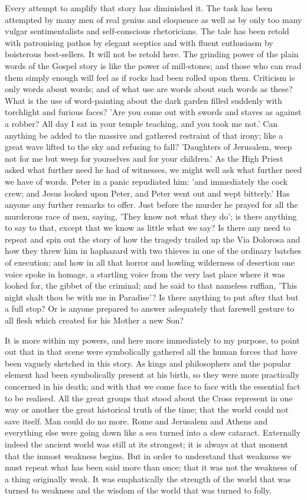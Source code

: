 Every attempt to amplify that story has diminished it. The task has been attempted by many men of real genius and eloquence as well as by only too many vulgar sentimentalists and self-conscious rhetoricians. The tale has been retold with patronising pathos by elegant sceptics and with fluent enthusiasm by boisterous best-sellers. It will not be retold here. The grinding power of the plain words of the Gospel story is like the power of mill-stones; and those who can read them simply enough will feel as if rocks had been rolled upon them. Criticism is only words about words; and of what use are words about such words as these? What is the use of word-painting about the dark garden filled suddenly with torchlight and furious faces? 'Are you come out with swords and staves as against a robber? All day I sat in your temple teaching, and you took me not.' Can anything be added to the massive and gathered restraint of that irony; like a great wave lifted to the sky and refusing to fall? 'Daughters of Jerusalem, weep not for me but weep for yourselves and for your children.' As the High Priest asked what further need he had of witnesses, we might well ask what further need we have of words. Peter in a panic repudiated him: 'and immediately the cock crew; and Jesus looked upon Peter, and Peter went out and wept bitterly.' Has anyone any further remarks to offer. Just before the murder he prayed for all the murderous race of men, saying, 'They know not what they do'; is there anything to say to that, except that we know as little what we say? Is there any need to repeat and spin out the story of how the tragedy trailed up the Via Dolorosa and how they threw him in haphazard with two thieves in one of the ordinary batches of execution; and how in all that horror and howling wilderness of desertion one voice spoke in homage, a startling voice from the very last place where it was looked for, the gibbet of the criminal; and he said to that nameless ruffian, 'This night shalt thou be with me in Paradise'? Is there anything to put after that but a full stop? Or is anyone prepared to answer adequately that farewell gesture to all flesh which created for his Mother a new Son?

It is more within my powers, and here more immediately to my purpose, to point out that in that scene were symbolically gathered all the human forces that have been vaguely sketched in this story. As kings and philosophers and the popular element had been symbolically present at his birth, so they were more practically concerned in his death; and with that we come face to face with the essential fact to be realised. All the great groups that stood about the Cross represent in one way or another the great historical truth of the time; that the world could not save itself. Man could do no more. Rome and Jerusalem and Athens and everything else were going down like a sea turned into a slow cataract. Externally indeed the ancient world was still at its strongest; it is always at that moment that the inmost weakness begins. But in order to understand that weakness we must repeat what has been said more than once; that it was not the weakness of a thing originally weak. It was emphatically the strength of the world that was turned to weakness and the wisdom of the world that was turned to folly.

